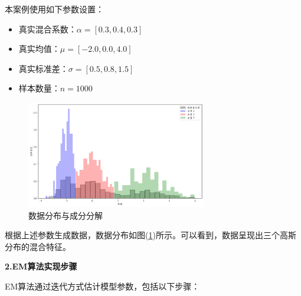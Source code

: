 \documentclass[a4paper,12pt]{ctexart} %
\begin{document}
本案例使用如下参数设置：
\begin{itemize}
    \item 真实混合系数：$\alpha = [0.3, 0.4, 0.3]$
    \item 真实均值：$\mu = [-2.0, 0.0, 4.0]$
    \item 真实标准差：$\sigma = [0.5, 0.8, 1.5]$
    \item 样本数量：$n = 1000$
\end{itemize}
\begin{figure}[H]
    \centering
    \includegraphics[width=0.7\textwidth]{fig/gmm_histogram.png}
    \caption{数据分布与成分分解}
    \label{fig:gmm_histogram}
\end{figure}

根据上述参数生成数据，数据分布如图(\ref{fig:gmm_histogram})所示。可以看到，数据呈现出三个高斯分布的混合特征。

\begin{flushleft}
    \textbf{2.EM算法实现步骤}
\end{flushleft}

EM算法通过迭代方式估计模型参数，包括以下步骤：
\end{document}
